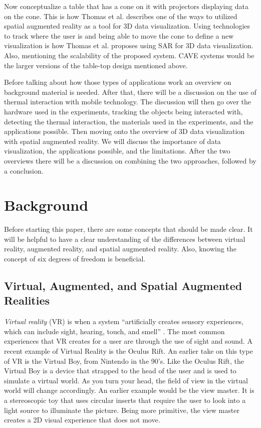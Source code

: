 \documentclass{sig-alternate}
\begin{document}
Now conceptualize a table that has a cone on it with projectors displaying data on the cone. This is how Thomas et al. describes one of the ways to utilized spatial augmented reality as a tool for 3D data visualization. Using technologies to track where the user is and being able to move the cone to define a new visualization is how Thomas et al. \cite{3D} proposes using SAR for 3D data visualization. Also, mentioning the scalability of the proposed system. CAVE systems would be the larger versions of the table-top design mentioned above.      

Before talking about how those types of applications work an overview on background material is needed. After that, there will be a discussion on the use of thermal interaction with mobile technology. The discussion will then go over the hardware used in the experiments, tracking the objects being interacted with, detecting the thermal interaction, the materials used in the experiments, and the applications possible. Then moving onto the overview of 3D data visualization with spatial augmented reality. We will  discuss the importance of data visualization, the applications possible, and the limitations. After the two overviews there will be a discussion on combining the two approaches, followed by a conclusion.       


\section{Background}
\label{sec:background} 
Before starting this paper, there are some concepts that should be made clear. It will be helpful to have a clear understanding of the differences between virtual reality, augmented reality, and spatial augmented reality. Also, knowing the concept of six degrees of freedom is beneficial.  

\subsection{Virtual, Augmented, and Spatial Augmented  Realities}
\label{sec:Reality}
\textit{Virtual reality} (VR) is when a system ``artificially creates sensory experiences, which can include sight, hearing, touch, and smell'' \cite{VR}. The most common experiences that VR creates for a user are through the use of sight and sound. A recent example of Virtual Reality is the Oculus Rift. An earlier take on this type of VR is the Virtual Boy, from Nintendo in the 90's. Like the Oculus Rift, the Virtual Boy is a device that strapped to the head of the user and is used to simulate a virtual world. As you turn your head, the field of view in the virtual world will change accordingly. An earlier example would be the view master. It is a stereoscopic toy that uses circular inserts that require the user to look into a light source to illuminate the picture. Being more primitive, the view master creates a 2D visual experience that does not move.       
\end{document}
